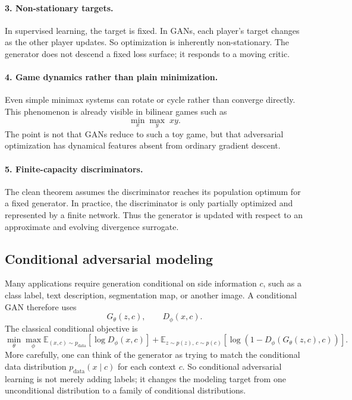 \paragraph{3. Non-stationary targets.}
In supervised learning, the target is fixed.
In GANs, each player's target changes as the other player updates.
So optimization is inherently non-stationary.
The generator does not descend a fixed loss surface; it responds to a moving critic.

\paragraph{4. Game dynamics rather than plain minimization.}
Even simple minimax systems can rotate or cycle rather than converge directly.
This phenomenon is already visible in bilinear games such as
\[
\min_x \max_y \; xy.
\]
The point is not that GANs reduce to such a toy game, but that adversarial optimization has dynamical features absent from ordinary gradient descent.

\paragraph{5. Finite-capacity discriminators.}
The clean theorem assumes the discriminator reaches its population optimum for a fixed generator.
In practice, the discriminator is only partially optimized and represented by a finite network.
Thus the generator is updated with respect to an approximate and evolving divergence surrogate.

\subsection*{Conditional adversarial modeling}

Many applications require generation conditional on side information $c$, such as a class label, text description, segmentation map, or another image.
A conditional GAN therefore uses
\[
G_\theta(z,c), \qquad D_\phi(x,c).
\]
The classical conditional objective is
\[
\min_\theta \max_\phi
\mathbb E_{(x,c)\sim p_{\mathrm{data}}}[\log D_\phi(x,c)]
+
\mathbb E_{z\sim p(z),\,c\sim p(c)}[\log(1-D_\phi(G_\theta(z,c),c))].
\]
More carefully, one can think of the generator as trying to match the conditional data distribution $p_{\mathrm{data}}(x\mid c)$ for each context $c$.
So conditional adversarial learning is not merely adding labels; it changes the modeling target from one unconditional distribution to a family of conditional distributions.

